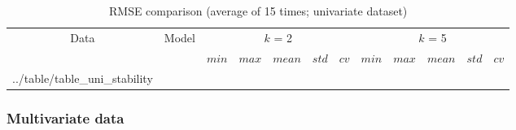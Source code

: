 \documentclass[smallcondensed, natbib]{svjour3}     %
\makeatletter
\newcommand\primitiveinput[1]
		{\@@input #1 }
\makeatother
\begin{document}
{%
\begin{table}[h]
	\caption{RMSE comparison (average of 15 times; univariate dataset)}
	\label{table:uni_stability}
	\centering
	\begin{adjustbox}{width=\textwidth}
		\begin{tabular}{| c | c| c | c | c | c | c | c | c | c | c | c |}%
		\hline
			 \multirow{2}{*}{Data} & \multirow{2}{*}{Model} & \multicolumn{5}{c|}{$k$ = 2} & \multicolumn{5}{c|}{ $k$ = 5 } \\ 
			 \cline{3-12}
	   		& & $min$ & $max$ & $mean$ & $std$ & $cv$ &   $min$ & $max$ & $mean$ & $std$ & $cv$ \\ [0.5ex] 
		\hline
			\primitiveinput{../table/table_uni_stability}
		\hline
		\end{tabular}
	\end{adjustbox}
\end{table}



\subsubsection{Multivariate data}

}
\end{document}
